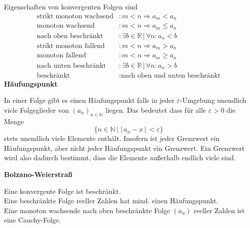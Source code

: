 \documentclass[a4paper,12pt]{article}
\begin{document}
Eigenschaften von konvergenten Folgen sind
\begin{align*}
        \text{strikt monoton wachsend}&: m<n\Rightarrow a_m<a_n \\
        \text{monoton wachsend}&: m<n\Rightarrow a_m\leq a_n \\
        \text{nach oben beschränkt}&: \exists b \in \mathbb{R}\,|\, \forall n:a_n<b \\
        \text{strikt monoton fallend}&: m<n\Rightarrow a_m>a_n \\
        \text{monoton fallend}&: m<n\Rightarrow a_m\geq a_n \\
        \text{nach unten beschränkt}&: \exists b \in \mathbb{R}\,|\, \forall n:a_n>b \\
        \text{beschränkt}&: \text{nach oben und unten beschränkt}
\end{align*}
\textbf{Häufungspunkt}
\begin{center}
In einer Folge gibt es einen Häufungspunkt falls in jeder $\varepsilon $-Umgebung unendlich viele Folgeglieder von $\left(a_n\right)_{n  \in \mathbb{N}}$ liegen. Das bedeutet dass für alle $\varepsilon >0$ die Menge 
\[
        \{n  \in \mathbb{N}\,|\, \,|\, a_n-x\,|\, <\varepsilon \}
\]
stets unendlich viele Elemente enthält. Insofern ist jeder Grenzwert ein Häufungspunkt, aber nicht jeder Häufungspunkt ein Grenzwert. Ein Grenzwert wird also dadurch bestimmt, dass die Elemente außerhalb endlich viele sind.
\end{center}
\textbf{Bolzano-Weierstraß}
\begin{center}
Eine konvergente Folge ist beschränkt.\\Eine beschränkte Folge reeller Zahlen hat mind. einen Häufungspunkt.\\Eine monoton wachsende nach oben beschränkte Folge $\left(a_n\right)$ reeller Zahlen ist eine Cauchy-Folge.
\end{center}
\end{document}
